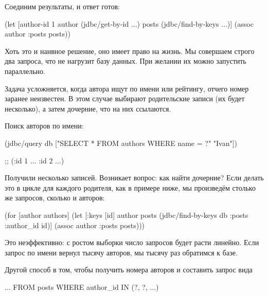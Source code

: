 Соединим результаты, и ответ готов:

\begin{english}
  \begin{clojure}
(let [author-id 1
      author (jdbc/get-by-id ...)
      posts (jdbc/find-by-keys ...)]
  (assoc author :posts posts))
  \end{clojure}
\end{english}

Хоть это и наивное решение, оно имеет право на жизнь. Мы совершаем строго два запроса, что не нагрузит базу данных. При желании их можно запустить параллельно.

Задача усложняется, когда автора ищут по имени или рейтингу, отчего номер заранее неизвестен. В этом случае выбирают родительские записи (их будет несколько), а затем дочерние, что на них ссылаются.

Поиск авторов по имени:

\begin{english}
  \begin{clojure}
(jdbc/query db ["SELECT * FROM authors
                 WHERE name = ?" "Ivan"])

;; ({:id 1 ...} {:id 2 ...})
  \end{clojure}
\end{english}

Получили несколько записей. Возникает вопрос: как найти дочерние? Если делать это в цикле для каждого родителя, как в примере ниже, мы произведём столько же запросов, сколько и авторов:

\begin{english}
  \begin{clojure}
(for [author authors]
  (let [{:keys [id]} author
        posts (jdbc/find-by-keys
                db :posts {:author_id id})]
    (assoc author :posts posts)))
  \end{clojure}
\end{english}


Это неэффективно: с ростом выборки число запросов будет расти линейно. Если запрос по имени вернул тысячу авторов, мы тысячу раз обратимся к базе.

Другой способ в том, чтобы получить номера авторов и составить запрос вида

\begin{english}
  \begin{sql}
... FROM posts WHERE author_id IN (?, ?, ...)
  \end{sql}
\end{english}

